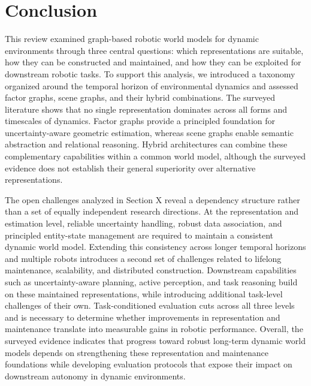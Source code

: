 \section{Conclusion}\label{sec:conclusion}
This review examined graph-based robotic world models for dynamic environments through three central questions: which representations are suitable, how they can be constructed and maintained, and how they can be exploited for downstream robotic tasks.
To support this analysis, we introduced a taxonomy organized around the temporal horizon of environmental dynamics and assessed factor graphs, scene graphs, and their hybrid combinations.
The surveyed literature shows that no single representation dominates across all forms and timescales of dynamics. 
Factor graphs provide a principled foundation for uncertainty-aware geometric estimation, whereas scene graphs enable semantic abstraction and relational reasoning.  Hybrid architectures can combine these complementary capabilities within a common world model, although the surveyed evidence does not establish their general superiority over alternative representations.

The open challenges analyzed in Section X reveal a dependency structure rather than a set of equally independent research directions.
At the representation and estimation level, reliable uncertainty handling, robust data association, and principled entity-state management are required to maintain a consistent dynamic world model.
Extending this consistency across longer temporal horizons and multiple robots introduces a second set of challenges related to lifelong maintenance, scalability, and distributed construction.
Downstream capabilities such as uncertainty-aware planning, active perception, and task reasoning build on these maintained representations, while introducing additional task-level challenges of their own.
Task-conditioned evaluation cuts across all three levels and is necessary to determine whether improvements in representation and maintenance translate into measurable gains in robotic performance.
Overall, the surveyed evidence indicates that progress toward robust long-term dynamic world models depends on strengthening these representation and maintenance foundations while developing evaluation protocols that expose their impact on downstream autonomy in dynamic environments.

